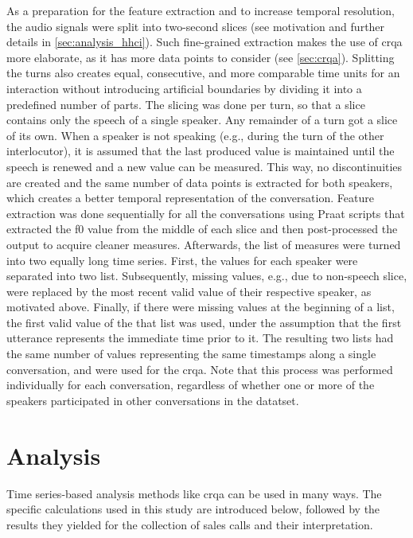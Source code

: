 As a preparation for the feature extraction and to increase temporal resolution, the audio signals were split into two-second slices (see motivation and further details in \cref{sec:analysis_hhci}).
Such fine-grained extraction makes the use of \ac{crqa} more elaborate, as it has more data points to consider (see \cref{sec:crqa}).
Splitting the turns also creates equal, consecutive, and more comparable time units for an interaction without introducing artificial boundaries by dividing it into a predefined number of parts.
The slicing was done per turn, so that a slice contains only the speech of a single speaker.
Any remainder of a turn got a slice of its own.
When a speaker is not speaking (e.g., during the turn of the other interlocutor), it is assumed that the last produced value is maintained until the speech is renewed and a new value can be measured.
This way, no discontinuities are created and the same number of data points is extracted for both speakers, which creates a better temporal representation of the conversation.
Feature extraction was done sequentially for all the conversations using Praat \citep{Boersma2001praat} scripts that extracted the \ac{f0} value from the middle of each slice and then post-processed the output to acquire cleaner measures.
Afterwards, the list of measures were turned into two equally long time series.
First, the values for each speaker were separated into two list.
Subsequently, missing values, e.g., due to non-speech slice, were replaced by the most recent valid value of their respective speaker, as motivated above.
Finally, if there were missing values at the beginning of a list, the first valid value of the that list was used, under the assumption that the first utterance represents the immediate time prior to it.
The resulting two lists had the same number of values representing the same timestamps along a single conversation, and were used for the \ac{crqa}.
Note that this process was performed individually for each conversation, regardless of whether one or more of the speakers participated in other conversations in the datatset.

\section{Analysis}
\label{sec:analysis_hhi}

Time series-based analysis methods like \ac{crqa} can be used in many ways.
The specific calculations used in this study are introduced below, followed by the results they yielded for the collection of sales calls and their interpretation.

